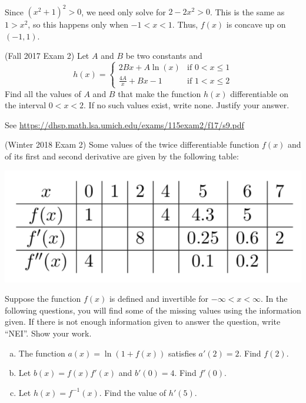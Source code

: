 \documentclass[11pt]{exam}
\begin{document}
\begin{questions}
\begin{solution}
\begin{align*}
    \end{align*}
    Since \((x^2+1)^2 > 0\), we need only solve for \(2-2x^2 >
    0\). This is the same as \(1 > x^2\), so this happens
    only when \(-1 < x < 1\). Thus, \(f(x)\) is concave up on \((-1,1)\).
  \end{solution}
\question (Fall 2017 Exam 2) %
  Let \(A\) and \(B\) be two constants and
$$h(x) = \left\lbrace \begin{array}{ll} \!\! 2Bx + A \ln(x) & \textrm{if } 0 < x \leqslant 1 \\ \!\!\displaystyle\frac{4A}{x} + Bx - 1 & \textrm{if } 1 < x \leqslant 2 \end{array}\right.$$
Find all the values of $A$ and $B$ that make the function $h(x)$ differentiable on the interval $0 < x < 2$. If no such values exist, write none. Justify your answer.
\begin{solution}
  See \href{https://dhsp.math.lsa.umich.edu/exams/115exam2/f17/s9.pdf}{https://dhsp.math.lsa.umich.edu/exams/115exam2/f17/s9.pdf}
\end{solution}
\question (Winter 2018 Exam 2) %
  Some values of the twice differentiable function \(f(x)\) and of its first and second
derivative are given by the following table:
\begin{center}
  \includegraphics[scale=0.6]{table.png}
\end{center}
Suppose the function $f(x)$ is defined and invertible for $-\infty < x < \infty$. In the following questions, you will find some of the missing values using the information given. If there is not enough information given to answer the question, write “NEI”. Show your work.
\begin{enumerate}[(a)]
	\item The function $a(x) = \ln(1 + f(x))$ satisfies $a'(2) = 2$. Find $f(2)$.
	\item Let $b(x) = f(x) f'(x)$ and $b'(0)=4$. Find $f'(0)$.
	\item Let $h(x) = f^{-1}(x)$. Find the value of $h'(5)$.
\end{enumerate}

\end{questions}
\end{document}
